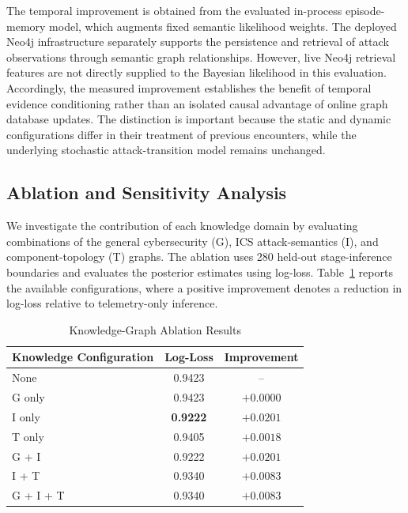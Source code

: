 \documentclass[10pt,conference]{IEEEtran}
\begin{document}
The temporal improvement is obtained from the evaluated in-process episode-memory model, which augments fixed semantic likelihood weights. The deployed Neo4j infrastructure separately supports the persistence and retrieval of attack observations through semantic graph relationships. However, live Neo4j retrieval features are not directly supplied to the Bayesian likelihood in this evaluation. Accordingly, the measured improvement establishes the benefit of temporal evidence conditioning rather than an isolated causal advantage of online graph database updates. The distinction is important because the static and dynamic configurations differ in their treatment of previous encounters, while the underlying stochastic attack-transition model remains unchanged.

\subsection{Ablation and Sensitivity Analysis}

We investigate the contribution of each knowledge domain by evaluating combinations of the general cybersecurity (G), ICS attack-semantics (I), and component-topology (T) graphs. The ablation uses 280 held-out stage-inference boundaries and evaluates the posterior estimates using log-loss. Table~\ref{tab:kg_ablation} reports the available configurations, where a positive improvement denotes a reduction in log-loss relative to telemetry-only inference.

\begin{table}[t]
\centering
\caption{Knowledge-Graph Ablation Results}
\label{tab:kg_ablation}
\scriptsize
\begin{tabular}{lcc}
\hline
\textbf{Knowledge Configuration} &
\textbf{Log-Loss} & \textbf{Improvement} \\
\hline
None & 0.9423 & -- \\
G only & 0.9423 & $+0.0000$ \\
I only & \textbf{0.9222} & $\mathbf{+0.0201}$ \\
T only & 0.9405 & $+0.0018$ \\
G + I & 0.9222 & $+0.0201$ \\
I + T & 0.9340 & $+0.0083$ \\
G + I + T & 0.9340 & $+0.0083$ \\
\hline
\end{tabular}
\end{table}
\end{document}
